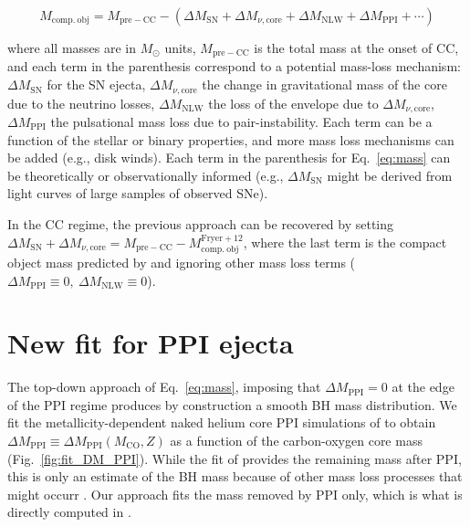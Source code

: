 \documentclass[twocolumn]{aastex63}
\DeclareRobustCommand{\Eqref}[1]{Eq.~\ref{#1}}
\DeclareRobustCommand{\Figref}[1]{Fig.~\ref{#1}}
\begin{document}
\begin{widetext}
  \begin{equation}
    \label{eq:mass}
    M_\mathrm{comp.\ obj} = M_\mathrm{pre-CC} - \left(\Delta M_\mathrm{SN} + \Delta M_{\nu, \mathrm{core}} + \Delta M_\mathrm{NLW} + \Delta M_\mathrm{PPI} + \cdots \right)
  \end{equation}
\end{widetext}

where all masses are in $M_\odot$ units, $M_\mathrm{pre-CC}$ is the
total mass at the onset of CC, and each term in the
parenthesis correspond to a potential mass-loss mechanism:
$\Delta M_\mathrm{SN}$ for the SN ejecta,
$\Delta M_{\nu, \mathrm{core}}$ the change in gravitational mass of
the core due to the neutrino losses, $\Delta M_\mathrm{NLW}$ the
\cite{nadezhin:80, lovegrove:13} loss of the envelope due to
$\Delta M_{\nu, \mathrm{core}}$, $\Delta M_\mathrm{PPI}$ the
pulsational mass loss due to pair-instability. Each term can be a
function of the stellar or binary properties, and more mass loss
mechanisms can be added (e.g., disk winds). Each term in the parenthesis for
\Eqref{eq:mass} can be theoretically or observationally informed
(e.g., $\Delta M_\mathrm{SN}$ might be derived from light curves of
large samples of observed SNe).

In the CC regime, the previous approach can be recovered by setting
$\Delta M_\mathrm{SN} + \Delta M_{\nu, \mathrm{core}} = M_\mathrm{pre-CC} - M_\mathrm{comp.\ obj}^\mathrm{Fryer+12}$,
where the last term is the compact object mass predicted by
\cite{fryer:12} and ignoring other mass loss terms
($\Delta M_\mathrm{PPI}\equiv 0, \ \Delta M_\mathrm{NLW}\equiv0$).

\section{New fit for PPI ejecta}

The top-down approach of \Eqref{eq:mass}, imposing that
$\Delta M_\mathrm{PPI}=0$ at the edge of the PPI regime
produces by construction a smooth BH mass
distribution. We fit the metallicity-dependent naked helium core PPI
simulations of \cite{farmer:19} to obtain
$\Delta M_\mathrm{PPI} \equiv \Delta M_\mathrm{PPI}(M_\mathrm{CO},Z)$ as
a function of the carbon-oxygen core mass (\Figref{fig:fit_DM_PPI}). While the fit of
\cite{farmer:19} provides the remaining mass after PPI, this is only
an estimate of the BH mass because of other mass loss processes that
might occurr \citep[e.g.,][]{renzo:20csm, powell:21, rahman:22}. Our approach
fits the mass removed by PPI only, which is what is directly computed
in \cite{farmer:19}.
\end{document}

